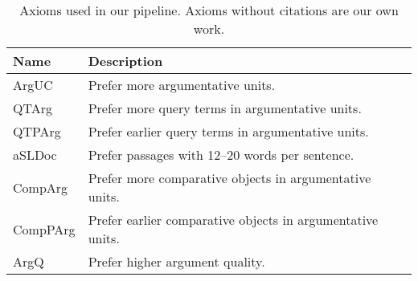 \begin{table}
    \caption{Axioms used in our pipeline. Axioms without citations are our own work.}
    \label{table-axioms}
    \begin{tabular}{ll}
        \toprule
        \textbf{Name} & \textbf{Description} \\
        \midrule
        ArgUC~\cite{BondarenkoHVSPB2018} & Prefer more argumentative units. \\
        QTArg~\cite{BondarenkoHVSPB2018} & Prefer more query terms in argumentative units. \\
        QTPArg~\cite{BondarenkoHVSPB2018} & Prefer earlier query terms in argumentative units. \\
        aSLDoc~\cite{BondarenkoFKHVS2019} & Prefer passages with 12--20 words per sentence. \\
        CompArg & Prefer more comparative objects in argumentative units. \\
        CompPArg & Prefer earlier comparative objects in argumentative units. \\
        ArgQ & Prefer higher argument quality. \\ 
        \bottomrule
    \end{tabular}
\end{table}

